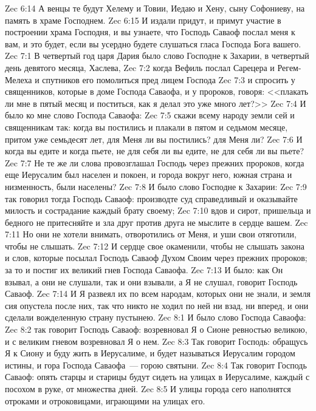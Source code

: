 \vs Zec 6:14 А венцы те будут Хелему и Товии, Иедаю и Хену, сыну Софониеву, на память в храме Господнем.
\vs Zec 6:15 И издали придут, и примут участие в построении храма Господня, и вы узнаете, что Господь Саваоф послал меня к вам, и это будет, если вы усердно будете слушаться гласа Господа Бога вашего.
\vs Zec 7:1 В четвертый год царя Дария было слово Господне к Захарии, в четвертый день девятого месяца, Хаслева,
\vs Zec 7:2 когда Вефиль послал Сарецера и Регем-Мелеха и спутников его помолиться пред лицем Господа
\vs Zec 7:3 и спросить у священников, которые в доме Господа Саваофа, и у пророков, говоря: <<плакать ли мне в пятый месяц и поститься, как я делал это уже много лет?>>
\vs Zec 7:4 И было ко мне слово Господа Саваофа:
\vs Zec 7:5 скажи всему народу земли сей и священникам так: когда вы постились и плакали в пятом и седьмом месяце, притом уже семьдесят лет, для Меня ли вы постились? для Меня ли?
\vs Zec 7:6 И когда вы едите и когда пьете, не для себя ли вы едите, не для себя ли вы пьете?
\vs Zec 7:7 Не те же ли слова провозглашал Господь через прежних пророков, когда еще Иерусалим был населен и покоен, и города вокруг него, южная страна и низменность, были населены?
\vs Zec 7:8 И было слово Господне к Захарии:
\vs Zec 7:9 так говорил тогда Господь Саваоф: производте суд справедливый и оказывайте милость и сострадание каждый брату своему;
\vs Zec 7:10 вдов и сирот, пришельца и бедного не притесняйте и зла друг против друга не мыслите в сердце вашем.
\vs Zec 7:11 Но они не хотели внимать, отворотились от Меня, и уши свои отяготили, чтобы не слышать.
\vs Zec 7:12 И сердце свое окаменили, чтобы не слышать закона и слов, которые посылал Господь Саваоф Духом Своим через прежних пророков; за то и постиг их великий гнев Господа Саваофа.
\vs Zec 7:13 И было: как Он взывал, а они не слушали, так и они взывали, а Я не слушал, говорит Господь Саваоф.
\vs Zec 7:14 И Я развеял их по всем народам, которых они не знали, и земля сия опустела после них, так что никто не ходил по ней ни взад, ни вперед, и они сделали вожделенную страну пустынею.
\vs Zec 8:1 И было слово Господа Саваофа:
\vs Zec 8:2 так говорит Господь Саваоф: возревновал Я о Сионе ревностью великою, и с великим гневом возревновал Я о нем.
\vs Zec 8:3 Так говорит Господь: обращусь Я к Сиону и буду жить в Иерусалиме, и будет называться Иерусалим городом истины, и гора Господа Саваофа~--- горою святыни.
\vs Zec 8:4 Так говорит Господь Саваоф: опять старцы и старицы будут сидеть на улицах в Иерусалиме, каждый с посохом в руке, от множества дней.
\vs Zec 8:5 И улицы города сего наполнятся отроками и отроковицами, играющими на улицах его.

